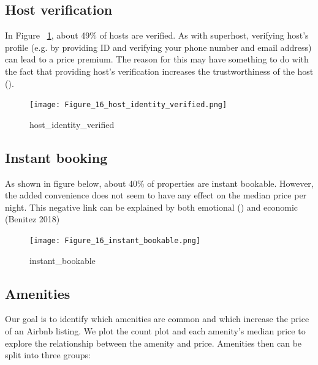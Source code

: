 \subsection{Host verification}

In Figure ~\ref{fig:host_identity_verified}, about 49\% of hosts are verified.
As with superhost, verifying host's profile (e.g. by providing ID and verifying
your phone number and email address) can lead to a price premium. The reason for
this may have something to do with the fact that providing host's verification
increases the trustworthiness of the host (\textcite{ert2016trust}).

\begin{figure}[H]
    \centering
    \texttt{[image: Figure\_16\_host\_identity\_verified.png]}
    \caption{host\_identity\_verified}
    \label{fig:host_identity_verified}
\end{figure}

\subsection{Instant booking}

As shown in figure below, about 40\% of properties are instant bookable. However, the added
convenience does not seem to have any effect on the median price per night. This
negative link can be explained by both emotional (\textcite{wang2017price}) and
economic (Benitez 2018) %

\begin{figure}[H]
    \centering
    \texttt{[image: Figure\_16\_instant\_bookable.png]}
    \caption{instant\_bookable}
    \label{fig:instant_bookable}
\end{figure}

\subsection{Amenities}

Our goal is to identify which amenities are common and which increase the price
of an Airbnb listing. We plot the count plot and each amenity's
median price to explore the relationship between the amenity and price.
Amenities then can be split into three groups:

